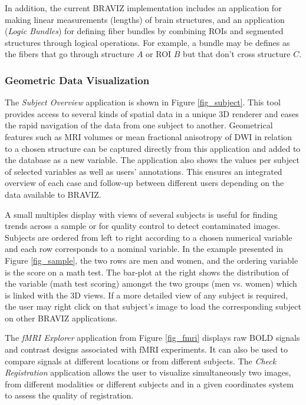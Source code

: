 \documentclass{frontiersHLTH}
\begin{document}
In addition, the current BRAVIZ implementation includes an application for making linear measurements (lengths) of brain structures, and an application (\emph{Logic Bundles}) for defining fiber bundles by combining ROIs and segmented structures through logical operations. For example, a bundle may be defines as the fibers that go through structure $A$ or ROI $B$ but that don't cross structure $C$. 


\subsubsection{Geometric Data Visualization}

The \emph{Subject Overview} application is shown in Figure \ref{fig_subject}. This tool  provides access to several kinds of spatial data in a unique 3D renderer and eases the rapid navigation of the data from one subject to another. Geometrical features such as MRI volumes or mean fractional anisotropy of DWI in relation to a chosen structure can be captured directly from this application and added to the database as a new variable. The application also shows the values per subject of selected variables as well as users' annotations. This ensures an integrated overview of each case and follow-up between different users depending on the data available to BRAVIZ.

A small multiples display \cite{tufte_visual_1983} with views  of several subjects is useful for finding trends across a sample or for quality control to detect contaminated images. Subjects are ordered from left to right according to a chosen numerical variable and each row corresponds to a nominal variable. In the example presented in Figure \ref{fig_sample}, the two rows are men and women, and the ordering variable is the score on a math test. The bar-plot at the right shows the distribution of the variable (math test scoring) amongst the two groups (men vs. women) which is linked with the 3D views. If a more detailed view of any subject is required, the user may right click on that subject’s image to load the corresponding subject on other BRAVIZ applications.

The \emph{fMRI Explorer} application from Figure \ref{fig_fmri} displays raw BOLD signals and contrast designs associated with fMRI experiments. It can also be used to compare signals at different locations or from different subjects. The \emph{Check Registration} application allows the user to visualize simultaneously two images, from different modalities or different subjects and in a given coordinates system to assess the quality of registration.
\end{document}
